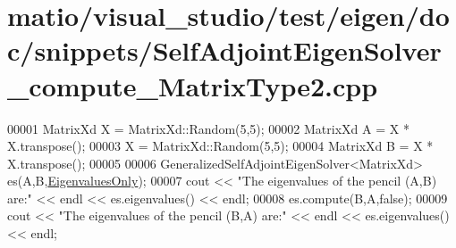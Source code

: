 \hypertarget{matio_2visual__studio_2test_2eigen_2doc_2snippets_2_self_adjoint_eigen_solver__compute___matrix_type2_8cpp_source}{}\section{matio/visual\+\_\+studio/test/eigen/doc/snippets/\+Self\+Adjoint\+Eigen\+Solver\+\_\+compute\+\_\+\+Matrix\+Type2.cpp}
\label{matio_2visual__studio_2test_2eigen_2doc_2snippets_2_self_adjoint_eigen_solver__compute___matrix_type2_8cpp_source}

\begin{DoxyCode}
00001 MatrixXd X = MatrixXd::Random(5,5);
00002 MatrixXd A = X * X.transpose();
00003 X = MatrixXd::Random(5,5);
00004 MatrixXd B = X * X.transpose();
00005 
00006 GeneralizedSelfAdjointEigenSolver<MatrixXd> es(A,B,\hyperlink{group__enums_ggae3e239fb70022eb8747994cf5d68b4a9ad0c82cf0a9daf2a63bb6e2f10d51f69c}{EigenvaluesOnly});
00007 cout << \textcolor{stringliteral}{"The eigenvalues of the pencil (A,B) are:"} << endl << es.eigenvalues() << endl;
00008 es.compute(B,A,\textcolor{keyword}{false});
00009 cout << \textcolor{stringliteral}{"The eigenvalues of the pencil (B,A) are:"} << endl << es.eigenvalues() << endl;
\end{DoxyCode}
